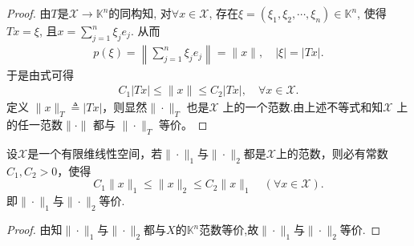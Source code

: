 \documentclass[../../main.tex]{subfiles}%
\begin{document}
\begin{proof}
由$T$是$\mathscr{X} \rightarrow \mathbb{K} ^n$的同构知, 对$\forall x\in \mathscr{X}$, 存在$\xi = (\xi _1,\xi _2,\cdots,\xi _n) \in \mathbb{K} ^n$, 使得$Tx=\xi$, 且$x=\sum\limits_{j=1}^n \xi _je_j$. 从而
\begin{align*}
p(\xi) = \left\| \sum\limits_{j=1}^n \xi _je_j \right\| = \|x\|, \quad |\xi|=|Tx|.
\end{align*}
于是由式可得
\begin{align*}
C_1|Tx|\leqslant \|x\| \leqslant C_2|Tx|, \quad \forall x\in \mathscr{X}.
\end{align*}
定义 $\|x\|_T \triangleq |Tx|$，则显然$\|\cdot\|_T$ 也是$\mathscr{X}$ 上的一个范数.由上述不等式和知$\mathscr{X}$ 上的任一范数$\|\cdot\|$ 都与 $\|\cdot\|_T$ 等价。
\end{proof}

\begin{corollary}\label{corollary:有限维赋范线性空间的范数都等价11}
设$\mathscr{X}$是一个有限维线性空间，若$\|\cdot\|_1$与$\|\cdot\|_2$都是$\mathscr{X}$上的范数，则必有常数$C_1,C_2>0$，使得
$$C_1\|x\|_1 \leqslant \|x\|_2 \leqslant C_2\|x\|_1 \quad (\forall x \in \mathscr{X}).$$
即$\|\cdot\|_1$与$\|\cdot\|_2$等价.
\end{corollary}
\begin{proof}

由知$\|\cdot\|_1$与$\|\cdot\|_2$都与$X$的$\mathbb{K}^n$范数等价,故$\|\cdot\|_1$与$\|\cdot\|_2$等价.
\end{proof}
\end{document}
